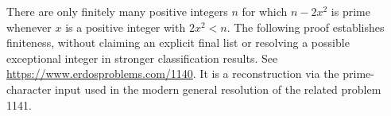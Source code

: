 There are only finitely many positive integers \(n\) for which \(n-2x^2\) is prime whenever \(x\) is a positive integer with \(2x^2<n\).
The following proof establishes finiteness, without claiming an explicit final list or resolving a possible exceptional integer in stronger classification results. See \url{https://www.erdosproblems.com/1140}. It is a reconstruction via the prime-character input used in the modern general resolution of the related problem 1141.
